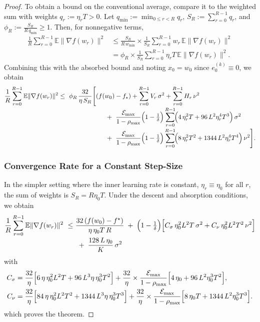 \documentclass{article} %
\newcommand{\E}{\mathbb{E}}
\begin{document}
\begin{proof}
To obtain a bound on the conventional average, compare it to the
weighted sum with weights \(q_r:=\eta_r T>0\). Let
\(q_{\min}:=\min_{0\le r<R} q_r\), \(S_R:=\sum_{r=0}^{R-1} q_r\), and
\(\displaystyle \phi_R:=\frac{S_R}{R\,q_{\min}}\ge 1\).
Then, for nonnegative terms,
\begin{align}
\frac{1}{R}\sum_{r=0}^{R-1}\E\|\nabla f(w_r)\|^{2}
&\le \frac{S_R}{R\,w_{\min}}\times \frac{1}{S_R}\sum_{r=0}^{R-1} w_r\,\E\|\nabla f(w_r)\|^{2}\\
&= \phi_R\times\frac{1}{S_R}\sum_{r=0}^{R-1}\eta_r T\,\E\|\nabla f(w_r)\|^{2}.
\end{align}
Combining this with the absorbed bound and noting \(x_0=w_0\) since \(e_0^{(k)}\equiv 0\), we obtain
\[
\begin{aligned}
\frac{1}{R}\sum_{r=0}^{R-1}\E\|\nabla f(w_r)\|^{2}
&\le\ \phi_R\,\frac{32}{\eta\,S_R}\Bigg[
(f(w_0)-f_\star)
+\sum_{r=0}^{R-1}V_r\,\sigma^{2}
+\sum_{r=0}^{R-1}H_r\,\nu^{2} \\[-2pt]
&\hspace{26mm}
+\ \frac{\mathcal E_{\max}}{1-\rho_{\max}}\Bigl(1-\tfrac1\delta\Bigr)
\sum_{r=0}^{R-1}\!\Bigl(4\,\eta_r^{2}T+96\,L^{2}\eta_r^{4}T^{3}\Bigr)\,\sigma^{2} \\[-2pt]
&\hspace{26mm}
+\ \frac{\mathcal E_{\max}}{1-\rho_{\max}}\Bigl(1-\tfrac1\delta\Bigr)
\sum_{r=0}^{R-1}\!\Bigl(8\,\eta_r^{2}T^{2}+1344\,L^{2}\eta_r^{4}T^{4}\Bigr)\,\nu^{2}
\Bigg].
\end{aligned}
\]

\subsubsection{Convergence Rate for a Constant Step-Size}

In the simpler setting where the inner learning rate is constant, $\eta_r \equiv \eta_0$ for all $r$, the sum of weights is $S_R = R\eta_0 T$. Under the descent and absorption conditions, we obtain
\begin{align*}
\frac{1}{R}\sum_{r=0}^{R-1}\E\|\nabla f(w_r)\|^{2}
\ \le\
&\frac{32\,(f(w_0)-f^\star)}{\eta\,\eta_0T\,R}
\;+\; \Bigl(1-\tfrac{1}{\delta}\Bigr)\Bigl[C_\sigma\,\eta_0^{2}L^{2}T\,\sigma^{2} + C_\nu\,\eta_0^{2}L^{2}T^{2}\,\nu^{2}\Bigr] \\[-2pt]
&\;+\; \frac{128\,L\,\eta_0}{K}\,\sigma^{2}
\end{align*}
with
\[
\begin{aligned}
C_\sigma&=\frac{32}{\eta}\Bigl[6\,\eta\,\eta_0^{2}L^{2}T+96\,L^{3}\eta\,\eta_0^{3}T^{2}\Bigr]
+\frac{32}{\eta}\times\frac{\mathcal E_{\max}}{1-\rho_{\max}}\Bigl[4\,\eta_0+96\,L^{2}\eta_0^{3}T^{2}\Bigr],\\
C_\nu&=\frac{32}{\eta}\Bigl[84\,\eta\,\eta_0^{2}L^{2}T^{2}+1344\,L^{3}\eta\,\eta_0^{3}T^{3}\Bigr]
+\frac{32}{\eta}\times\frac{\mathcal E_{\max}}{1-\rho_{\max}}\Bigl[8\,\eta_0T+1344\,L^{2}\eta_0^{3}T^{3}\Bigr].
\end{aligned}
\]
which proves the theorem.
\end{proof}
\end{document}
